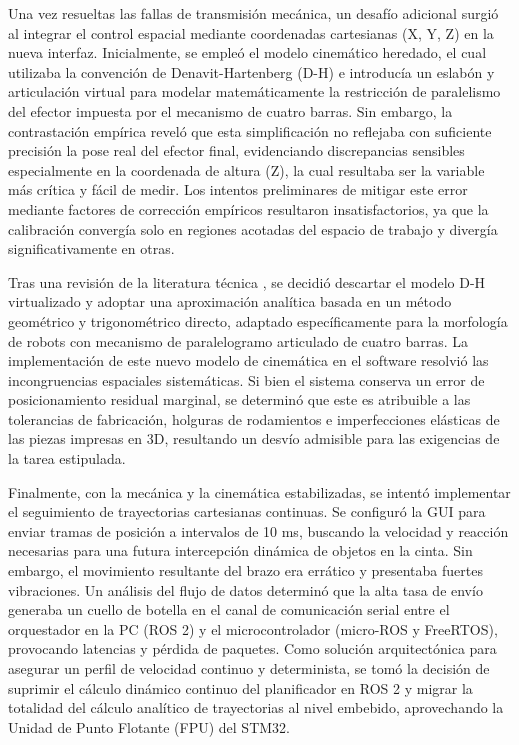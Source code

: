 \documentclass[12pt, a4paper]{report}
\begin{document}
Una vez resueltas las fallas de transmisión mecánica, un desafío adicional surgió al integrar el control espacial mediante coordenadas cartesianas (X, Y, Z) en la nueva interfaz. Inicialmente, se empleó el modelo cinemático heredado, el cual utilizaba la convención de Denavit-Hartenberg (D-H) e introducía un eslabón y articulación virtual para modelar matemáticamente la restricción de paralelismo del efector impuesta por el mecanismo de cuatro barras. Sin embargo, la contrastación empírica reveló que esta simplificación no reflejaba con suficiente precisión la pose real del efector final, evidenciando discrepancias sensibles especialmente en la coordenada de altura (Z), la cual resultaba ser la variable más crítica y fácil de medir. Los intentos preliminares de mitigar este error mediante factores de corrección empíricos resultaron insatisfactorios, ya que la calibración convergía solo en regiones acotadas del espacio de trabajo y divergía significativamente en otras.

Tras una revisión de la literatura técnica \cite{bib:kattel}, se decidió descartar el modelo D-H virtualizado y adoptar una aproximación analítica basada en un método geométrico y trigonométrico directo, adaptado específicamente para la morfología de robots con mecanismo de paralelogramo articulado de cuatro barras. La implementación de este nuevo modelo de cinemática en el software resolvió las incongruencias espaciales sistemáticas. Si bien el sistema conserva un error de posicionamiento residual marginal, se determinó que este es atribuible a las tolerancias de fabricación, holguras de rodamientos e imperfecciones elásticas de las piezas impresas en 3D, resultando un desvío admisible para las exigencias de la tarea estipulada.

Finalmente, con la mecánica y la cinemática estabilizadas, se intentó implementar el seguimiento de trayectorias cartesianas continuas. Se configuró la GUI para enviar tramas de posición a intervalos de 10 ms, buscando la velocidad y reacción necesarias para una futura intercepción dinámica de objetos en la cinta. Sin embargo, el movimiento resultante del brazo era errático y presentaba fuertes vibraciones. Un análisis del flujo de datos determinó que la alta tasa de envío generaba un cuello de botella en el canal de comunicación serial entre el orquestador en la PC (ROS 2) y el microcontrolador (micro-ROS y FreeRTOS), provocando latencias y pérdida de paquetes. Como solución arquitectónica para asegurar un perfil de velocidad continuo y determinista, se tomó la decisión de suprimir el cálculo dinámico continuo del planificador en ROS 2 y migrar la totalidad del cálculo analítico de trayectorias al nivel embebido, aprovechando la Unidad de Punto Flotante (FPU) del STM32.
\end{document}
